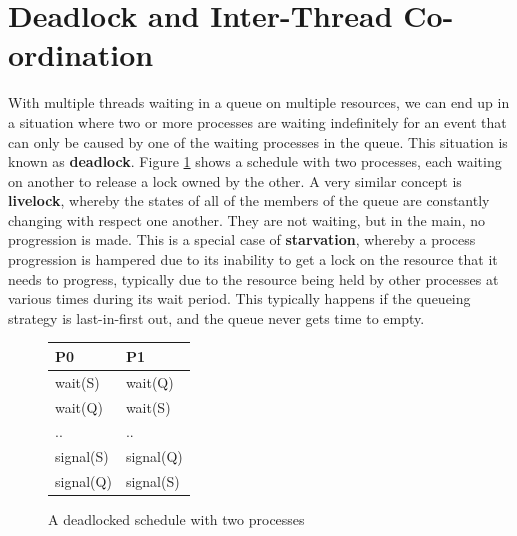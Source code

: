 \documentclass[10pt,a4paper]{article}
\begin{document}
\section{Deadlock and Inter-Thread Co-ordination}
With multiple threads waiting in a queue on multiple resources, we can end up in a situation where two or more processes are waiting indefinitely for an event that can only be caused by one of the waiting processes in the queue. This situation is known as {\bf deadlock}. Figure \ref{deadlock} shows a schedule with two processes, each waiting on another to release a lock owned by the other. A very similar concept is {\bf livelock}, whereby the states of all of the members of the queue are constantly changing with respect one another. They are not waiting, but in the main, no progression is made. This is a special case of {\bf starvation}, whereby a process progression is hampered due to its inability to get a lock on the resource that it needs to progress, typically due to the resource being held by other processes at various times during its wait period. This typically happens if the queueing strategy is last-in-first out, and the queue never gets time to empty. 
\begin{figure}
\caption{A deadlocked schedule with two processes}
\begin{center}
\begin{tabular}{| l | l | }
  \hline
  P0 & P1 \\ \hline
  wait(S) & wait(Q) \\
  wait(Q) & wait(S) \\
  .. & .. \\
  signal(S) & signal(Q) \\
  signal(Q)	& signal(S) \\
  \hline
\end{tabular}
\label{deadlock}
\end{center}
\end{figure}
\end{document}
